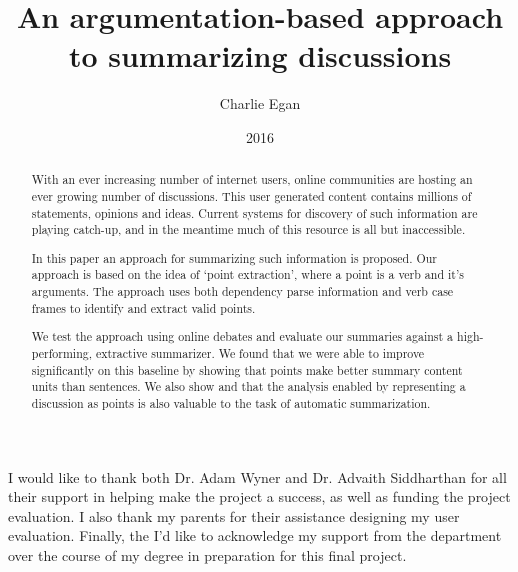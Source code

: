 \documentclass[BSc]{abdnthesis}
\title{An argumentation-based approach to summarizing discussions}
\author{Charlie Egan}
\date{2016}
\begin{document}

\maketitle
\makedeclaration


\begin{abstract}
  With an ever increasing number of internet users, online communities are hosting an ever growing number of discussions. This user generated content contains millions of statements, opinions and ideas. Current systems for discovery of such information are playing catch-up, and in the meantime much of this resource is all but inaccessible.

  In this paper an approach for summarizing such information is proposed. Our approach is based on the idea of `point extraction', where a point is a verb and it's arguments. The approach uses both dependency parse information and verb case frames to identify and extract valid points.

  We test the approach using online debates and evaluate our summaries against a high-performing, extractive summarizer. We found that we were able to improve significantly on this baseline by showing that points make better summary content units than sentences. We also show and that the analysis enabled by representing a discussion as points is also valuable to the task of automatic summarization.
\end{abstract}

\begin{acknowledgements}
  I would like to thank both Dr. Adam Wyner and Dr. Advaith Siddharthan for all their support in helping make the project a success, as well as funding the project evaluation. I also thank my parents for their assistance designing my user evaluation. Finally, the I'd like to acknowledge my support from the department over the course of my degree in preparation for this final project.
\end{acknowledgements}


\tableofcontents












\appendix




\end{document}
